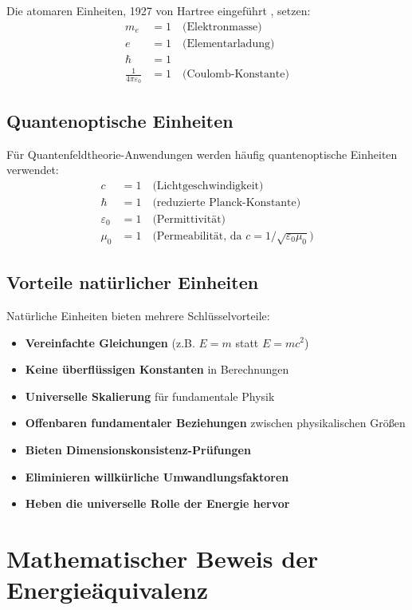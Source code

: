 	Die atomaren Einheiten, 1927 von Hartree eingeführt \cite{hartree1957}, setzen:
	\begin{align}
		m_e &= 1 \quad \text{(Elektronmasse)} \\
		e &= 1 \quad \text{(Elementarladung)} \\
		\hbar &= 1 \\
		\frac{1}{4\pi\varepsilon_0} &= 1 \quad \text{(Coulomb-Konstante)}
	\end{align}
	
	\subsection{Quantenoptische Einheiten}
	
	Für Quantenfeldtheorie-Anwendungen werden häufig quantenoptische Einheiten verwendet:
	\begin{align}
		c &= 1 \quad \text{(Lichtgeschwindigkeit)} \\
		\hbar &= 1 \quad \text{(reduzierte Planck-Konstante)} \\
		\varepsilon_0 &= 1 \quad \text{(Permittivität)} \\
		\mu_0 &= 1 \quad \text{(Permeabilität, da } c = 1/\sqrt{\varepsilon_0 \mu_0}\text{)}
	\end{align}
	
	\subsection{Vorteile natürlicher Einheiten}
	
	Natürliche Einheiten bieten mehrere Schlüsselvorteile:
	\begin{itemize}
		\item \textbf{Vereinfachte Gleichungen} (z.B. $E = m$ statt $E = mc^2$)
		\item \textbf{Keine überflüssigen Konstanten} in Berechnungen
		\item \textbf{Universelle Skalierung} für fundamentale Physik
		\item \textbf{Offenbaren fundamentaler Beziehungen} zwischen physikalischen Größen
		\item \textbf{Bieten Dimensionskonsistenz-Prüfungen}
		\item \textbf{Eliminieren willkürliche Umwandlungsfaktoren}
		\item \textbf{Heben die universelle Rolle der Energie hervor}
	\end{itemize}
	
	\section{Mathematischer Beweis der Energieäquivalenz}
	
